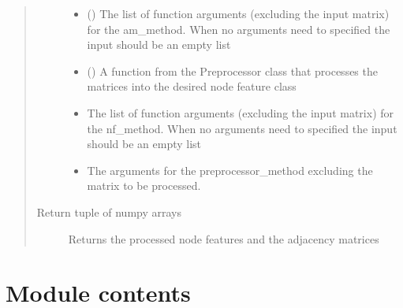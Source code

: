 \documentclass[letterpaper,10pt,english]{sphinxmanual}
\begin{document}
\begin{fulllineitems}
\begin{quote}
\begin{description}
\begin{itemize}
\item {} 
\sphinxstyleliteralstrong{\sphinxupquote{(}}\sphinxstyleliteralstrong{\sphinxupquote{)}} () \textendash{} The list of function arguments (excluding the input matrix) for the am\_method.
When no arguments need to specified the input should be an empty list

\item {} 
\sphinxstyleliteralstrong{\sphinxupquote{(}}\sphinxstyleliteralstrong{\sphinxupquote{)}} () \textendash{} A function from the Preprocessor class that
processes the matrices into the desired node
feature class

\item {} 
\sphinxstyleliteralstrong{\sphinxupquote{(}}\sphinxstyleliteralstrong{\sphinxupquote{)}} \textendash{} The list of function arguments (excluding the input matrix) for the nf\_method.
When no arguments need to specified the input should be an empty list

\item {} 
\sphinxstyleliteralstrong{\sphinxupquote{(}}\sphinxstyleliteralstrong{\sphinxupquote{)}} \textendash{} The arguments for the preprocessor\_method excluding the matrix to be processed.

\end{itemize}

\item[{Return tuple of numpy arrays}] \leavevmode
Returns the processed node features and the adjacency matrices

\end{description}\end{quote}

\end{fulllineitems}



\section{Module contents}
\label{\detokenize{modules/gqcml.datasets:module-gqcml.datasets}}\label{\detokenize{modules/gqcml.datasets:module-contents}}
\end{document}
